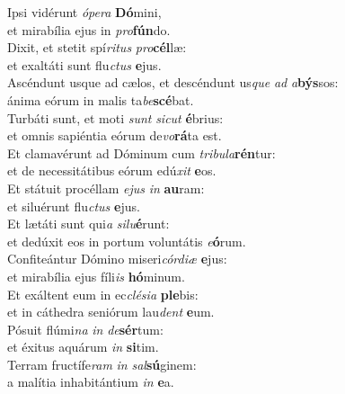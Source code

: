 \evenverse Ipsi vidérunt \textit{ó}\textit{pe}\textit{ra} \textbf{Dó}mini,~\*\\
\evenverse et mirabília ejus in \textit{pro}\textbf{fún}do.\\
\oddverse Dixit, et stetit spí\textit{ri}\textit{tus} \textit{pro}\textbf{cél}læ:~\*\\
\oddverse et exaltáti sunt flu\textit{ctus} \textbf{e}jus.\\
\evenverse Ascéndunt usque ad cælos, et descéndunt us\textit{que} \textit{ad} \textit{a}\textbf{býs}sos:~\*\\
\evenverse ánima eórum in malis ta\textit{be}\textbf{scé}bat.\\
\oddverse Turbáti sunt, et moti \textit{sunt} \textit{si}\textit{cut} \textbf{é}brius:~\*\\
\oddverse et omnis sapiéntia eórum de\textit{vo}\textbf{rá}ta est.\\
\evenverse Et clamavérunt ad Dóminum cum \textit{tri}\textit{bu}\textit{la}\textbf{rén}tur:~\*\\
\evenverse et de necessitátibus eórum edú\textit{xit} \textbf{e}os.\\
\oddverse Et státuit procéllam \textit{e}\textit{jus} \textit{in} \textbf{au}ram:~\*\\
\oddverse et siluérunt flu\textit{ctus} \textbf{e}jus.\\
\evenverse Et lætáti sunt qui\textit{a} \textit{si}\textit{lu}\textbf{é}runt:~\*\\
\evenverse et dedúxit eos in portum voluntátis \textit{e}\textbf{ó}rum.\\
\oddverse Confiteántur Dómino miseri\textit{cór}\textit{di}\textit{æ} \textbf{e}jus:~\*\\
\oddverse et mirabília ejus fíli\textit{is} \textbf{hó}minum.\\
\evenverse Et exáltent eum in ec\textit{clé}\textit{si}\textit{a} \textbf{ple}bis:~\*\\
\evenverse et in cáthedra seniórum lau\textit{dent} \textbf{e}um.\\
\oddverse Pósuit flúmi\textit{na} \textit{in} \textit{de}\textbf{sér}tum:~\*\\
\oddverse et éxitus aquárum \textit{in} \textbf{si}tim.\\
\evenverse Terram fructífe\textit{ram} \textit{in} \textit{sal}\textbf{sú}ginem:~\*\\
\evenverse a malítia inhabitántium \textit{in} \textbf{e}a.\\
